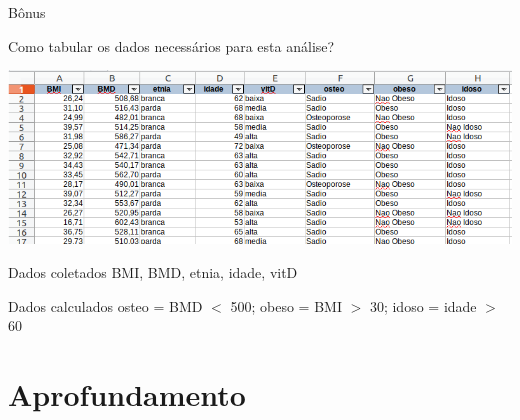 \documentclass{beamer}
\begin{document}
\begin{frame}[fragile]{\scriptsize Bônus}
  \begin{exampleblock}{Como tabular os dados necessários para esta análise?}
    \tiny
    \begin{center}
      \includegraphics[width=\textwidth]{Cap31-32/pratica-glm-dados}
    \end{center}
    \begin{exampleblock}{Dados coletados}
      BMI, BMD, etnia, idade, vitD
    \end{exampleblock}
    \begin{exampleblock}{Dados calculados}
      osteo = BMD $<$ 500; obeso = BMI $>$ 30; idoso = idade $>$ 60
    \end{exampleblock}

  \end{exampleblock}
\end{frame}

\section{Aprofundamento}
\end{document}

